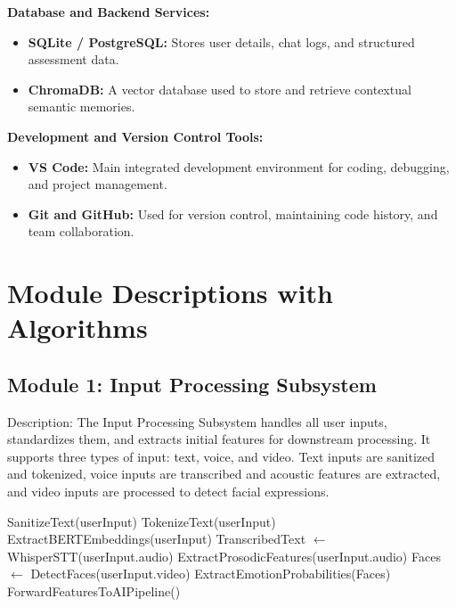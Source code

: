 \textbf{Database and Backend Services:}

\begin{itemize}
    \item \textbf{SQLite / PostgreSQL:} Stores user details, chat logs, and structured assessment data.
    \item \textbf{ChromaDB:} A vector database used to store and retrieve contextual semantic memories.
\end{itemize}

\textbf{Development and Version Control Tools:}

\begin{itemize}
    \item \textbf{VS Code:} Main integrated development environment for coding, debugging, and project management.
    \item \textbf{Git and GitHub:} Used for version control, maintaining code history, and team collaboration.
\end{itemize}

\newpage

\section{Module Descriptions with Algorithms}

\usepackage{algorithm}
\usepackage{algpseudocode}

\subsection{Module 1: Input Processing Subsystem}
Description:
The Input Processing Subsystem handles all user inputs, standardizes them, and extracts initial features for downstream processing. It supports three types of input: text, voice, and video. Text inputs are sanitized and tokenized, voice inputs are transcribed and acoustic features are extracted, and video inputs are processed to detect facial expressions.

\begin{algorithm}[H]
\caption{Input Processing Subsystem Algorithm}
\begin{algorithmic}[1]
        \State SanitizeText(userInput)
        \State TokenizeText(userInput)
        \State ExtractBERTEmbeddings(userInput)
        \State TranscribedText $\gets$ WhisperSTT(userInput.audio)
        \State ExtractProsodicFeatures(userInput.audio) 
        \State Faces $\gets$ DetectFaces(userInput.video)
        \State ExtractEmotionProbabilities(Faces) 
    \EndIf
    \State ForwardFeaturesToAIPipeline()
\EndProcedure
\end{algorithmic}
\end{algorithm}

